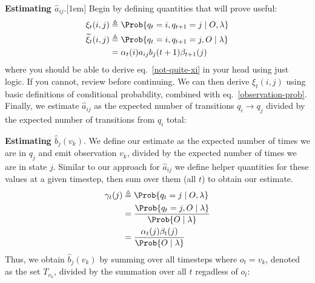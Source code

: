\documentclass[11pt]{article}
\begin{document}
\begin{compactenum}
	\item \textbf{Estimating $\hat a_{ij}$}.[1em] Begin by defining quantities that will prove useful:
	\begin{align}
		\xi_t(i, j) &\triangleq \Prob{q_t = i, q_{t + 1} = j \mid O, \lambda} \\
		\widetilde \xi_t(i, j) &\triangleq \Prob{q_t=i, q_{t+1}=j,  O \mid \lambda} \\
		&= \alpha_t(i) a_{ij}  b_j(t + 1) \beta_{t + 1}(j) \label{not-quite-xi}
	\end{align}
	where you should be able to derive eq.~\ref{not-quite-xi} in your head using just logic. If you cannot, review before continuing. We can then derive $\xi_t(i, j)$ using basic definitions of conditional probability, combined with eq.~\ref{observation-prob}. Finally, we estimate $\hat a_{ij}$ as the expected number of transitions $q_i \rightarrow q_j$ divided by the expected number of transitions from $q_i$ total:
		
	\item \textbf{Estimating $\hat b_j(v_k)$}. We define our estimate as the expected number of times we are in $q_j$ and emit observation $v_k$, divided by the expected number of times we are in state $j$. Similar to our approach for $\hat a_{ij}$ we define helper quantities for these values at a given timestep, then sum over them (all $t$) to obtain our estimate. 
	\begin{align}
		\gamma_t(j) &\triangleq \Prob{ q_t = j \mid O, \lambda} \\
		&= \frac{ \Prob{q_t = j, O \mid \lambda} }{ \Prob{  O \mid \lambda}} \\
		&= \frac{ \alpha_t(j) \beta_t(j) }{ \Prob{  O \mid \lambda}}
	\end{align}
	Thus, we obtain $\hat b_j(v_k)$ by summing over all timesteps where $o_t = v_k$, denoted as the set $T_{v_k}$, divided by the summation over all $t$ regadless of $o_t$:
\end{compactenum}
\end{document}
